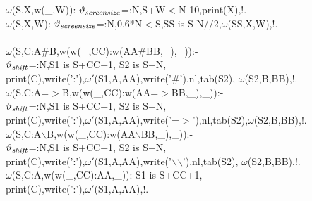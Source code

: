 \documentclass[11pt]{report}
\makeatletter
\newcommand{\ulinv}[1]{\index{#1@\texttt{#1}}}
\makeatother
\begin{document}
 \ulinv{wdecl}
\begin{sf}\begin{tabbing}
$\omega$(S,X,w(\_\hspace{0.1em},W)):-$\vartheta_{\it screensize}$=:N,S+W$<$N-10,print(X),!.\\[-0.15ex]
$\omega$(S,X,W):-$\vartheta_{\it screensize}$=:N,0.6*N$<$S,SS is S-N//2,$\omega$(SS,X,W),!.\\[-0.7ex]
\\[-0.15ex]
$\omega$(S,C:A\#B,w(w(\_\hspace{0.1em},CC):w(AA\#BB,\_\hspace{0.1em}),\_\hspace{0.1em})):- \\[-0.15ex]
\hspace{2em}$\vartheta_{\it shift}$=:N,S1 is S+CC+1, S2 is S+N,\\[-0.15ex]
\hspace{2em}print(C),write(':'),$\omega'$(S1,A,AA),write('\#'),nl,tab(S2), $\omega$(S2,B,BB),!.\\[-0.15ex]
$\omega$(S,C:A=$>$B,w(w(\_\hspace{0.1em},CC):w(AA=$>$BB,\_\hspace{0.1em}),\_\hspace{0.1em})):-\\[-0.15ex]
\hspace{2em}$\vartheta_{\it shift}$=:N,S1 is S+CC+1, S2 is S+N,\\[-0.15ex]
\hspace{2em}print(C),write(':'),$\omega'$(S1,A,AA),write('=$>$'),nl,tab(S2),$\omega$(S2,B,BB),!.\\[-0.15ex]
$\omega$(S,C:A$\backslash$B,w(w(\_\hspace{0.1em},CC):w(AA$\backslash$BB,\_\hspace{0.1em}),\_\hspace{0.1em})):-\\[-0.15ex]
\hspace{2em}$\vartheta_{\it shift}$=:N,S1 is S+CC+1, S2 is S+N,\\[-0.15ex]
\hspace{2em}print(C),write(':'),$\omega'$(S1,A,AA),write('$\backslash$$\backslash$'),nl,tab(S2), $\omega$(S2,B,BB),!.\\[-0.15ex]
$\omega$(S,C:A,w(w(\_\hspace{0.1em},CC):AA,\_\hspace{0.1em})):-S1 is S+CC+1,\\[-0.15ex]
\hspace{2em}print(C),write(':'),$\omega'$(S1,A,AA),!.\\[-0.15ex]
$$
\end{tabbing}
\end{sf}
\end{document}
